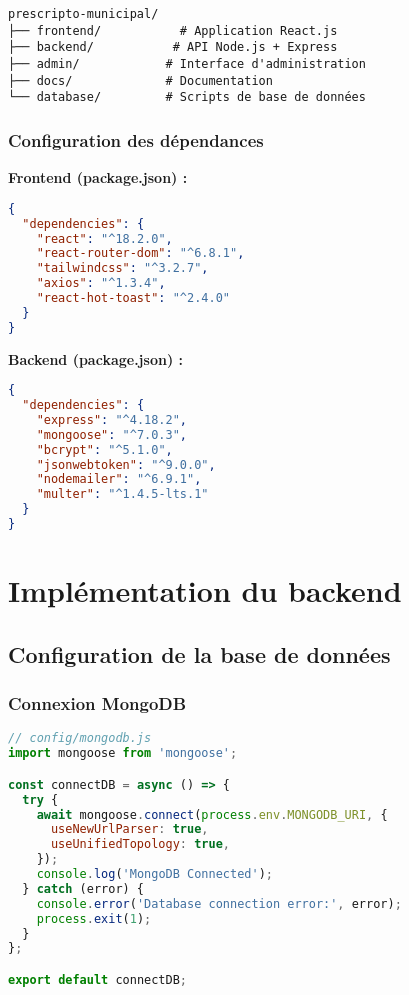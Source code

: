 \begin{lstlisting}[caption=Organisation des dossiers du projet]
prescripto-municipal/
├── frontend/           # Application React.js
├── backend/           # API Node.js + Express
├── admin/            # Interface d'administration
├── docs/             # Documentation
└── database/         # Scripts de base de données
\end{lstlisting}

\subsubsection{Configuration des dépendances}

\textbf{Frontend (package.json) :}
\begin{lstlisting}[language=JSON]
{
  "dependencies": {
    "react": "^18.2.0",
    "react-router-dom": "^6.8.1",
    "tailwindcss": "^3.2.7",
    "axios": "^1.3.4",
    "react-hot-toast": "^2.4.0"
  }
}
\end{lstlisting}

\textbf{Backend (package.json) :}
\begin{lstlisting}[language=JSON]
{
  "dependencies": {
    "express": "^4.18.2",
    "mongoose": "^7.0.3",
    "bcrypt": "^5.1.0",
    "jsonwebtoken": "^9.0.0",
    "nodemailer": "^6.9.1",
    "multer": "^1.4.5-lts.1"
  }
}
\end{lstlisting}

\section{Implémentation du backend}

\subsection{Configuration de la base de données}

\subsubsection{Connexion MongoDB}

\begin{lstlisting}[language=JavaScript, caption=Configuration MongoDB]
// config/mongodb.js
import mongoose from 'mongoose';

const connectDB = async () => {
  try {
    await mongoose.connect(process.env.MONGODB_URI, {
      useNewUrlParser: true,
      useUnifiedTopology: true,
    });
    console.log('MongoDB Connected');
  } catch (error) {
    console.error('Database connection error:', error);
    process.exit(1);
  }
};

export default connectDB;
\end{lstlisting}

